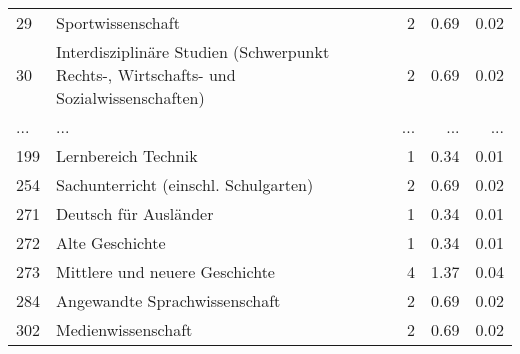 \begin{longtable}{lXrrr}
        29 & \multicolumn{1}{X}{Sportwissenschaft} & %
          \num{2} &
          \num[round-mode=places,round-precision=2]{0.69} &
          \num[round-mode=places,round-precision=2]{0.02} \\
        30 & \multicolumn{1}{X}{Interdisziplinäre Studien (Schwerpunkt Rechts-, Wirtschafts- und Sozialwissenschaften)} & %
          \num{2} &
          \num[round-mode=places,round-precision=2]{0.69} &
          \num[round-mode=places,round-precision=2]{0.02} \\
       ... & ... & ... & ... & ... \\
        199 & \multicolumn{1}{X}{Lernbereich Technik} & %
          \num{1} &
          \num[round-mode=places,round-precision=2]{0.34} &
          \num[round-mode=places,round-precision=2]{0.01} \\

        254 & \multicolumn{1}{X}{Sachunterricht (einschl. Schulgarten)} & %
          \num{2} &
          \num[round-mode=places,round-precision=2]{0.69} &
          \num[round-mode=places,round-precision=2]{0.02} \\

        271 & \multicolumn{1}{X}{Deutsch für Ausländer} & %
          \num{1} &
          \num[round-mode=places,round-precision=2]{0.34} &
          \num[round-mode=places,round-precision=2]{0.01} \\

        272 & \multicolumn{1}{X}{Alte Geschichte} & %
          \num{1} &
          \num[round-mode=places,round-precision=2]{0.34} &
          \num[round-mode=places,round-precision=2]{0.01} \\

        273 & \multicolumn{1}{X}{Mittlere und neuere Geschichte} & %
          \num{4} &
          \num[round-mode=places,round-precision=2]{1.37} &
          \num[round-mode=places,round-precision=2]{0.04} \\

        284 & \multicolumn{1}{X}{Angewandte Sprachwissenschaft} & %
          \num{2} &
          \num[round-mode=places,round-precision=2]{0.69} &
          \num[round-mode=places,round-precision=2]{0.02} \\

        302 & \multicolumn{1}{X}{Medienwissenschaft} & %
          \num{2} &
          \num[round-mode=places,round-precision=2]{0.69} &
          \num[round-mode=places,round-precision=2]{0.02} \\


\end{longtable}
